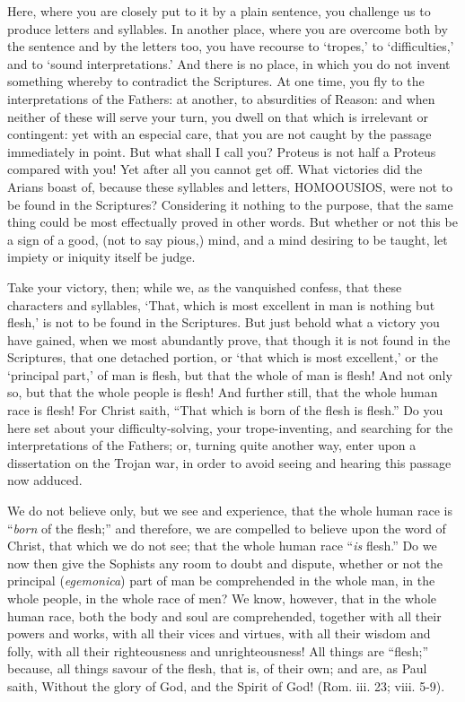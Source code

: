 Here, where you are closely put to it by a plain sentence, you challenge us to produce letters and syllables. In another place, where you are overcome both by the sentence and by the letters too, you have recourse to ‘tropes,’ to ‘difficulties,’ and to ‘sound interpretations.’ And there is no place, in which you do not invent something whereby to contradict the Scriptures. At one time, you fly to the interpretations of the Fathers: at another, to absurdities of Reason: and when neither of these will serve your turn, you dwell on that which is irrelevant or contingent: yet with an especial care, that you are not caught by the passage immediately in point. But what shall I call you? Proteus is not half a Proteus compared with you! Yet after all you cannot get off. What victories did the Arians boast of, because these syllables and letters, \textsc{HOMOOUSIOS}, were not to be found in the Scriptures? Considering it nothing to the purpose, that the same thing could be most effectually proved in other words. But whether or not this be a sign of a good, (not to say pious,) mind, and a mind desiring to be taught, let impiety or iniquity itself be judge.

Take your victory, then; while we, as the vanquished confess, that these characters and syllables, ‘That, which is most excellent in man is nothing but flesh,’ is not to be found in the Scriptures. But just behold what a victory you have gained, when we most abundantly prove, that though it is not found in the Scriptures, that one detached portion, or ‘that which is most excellent,’ or the ‘principal part,’ of man is flesh, but that the whole of man is flesh! And not only so, but that the whole people is flesh! And further still, that the whole human race is flesh! For Christ saith, “That which is born of the flesh is flesh.” Do you here set about your difficulty-solving, your trope-inventing, and searching for the interpretations of the Fathers; or, turning quite another way, enter upon a dissertation on the Trojan war, in order to avoid seeing and hearing this passage now adduced.

We do not believe only, but we see and experience, that the whole human race is “\emph{born }of the flesh;” and therefore, we are compelled to believe upon the word of Christ, that which we do not see; that the whole human race “\emph{is }flesh.” Do we now then give the Sophists any room to doubt and dispute, whether or not the principal (\emph{egemonica}) part of man be comprehended in the whole man, in the whole people, in the whole race of men? We know, however, that in the whole human race, both the body and soul are comprehended, together with all their powers and works, with all their vices and virtues, with all their wisdom and folly, with all their righteousness and unrighteousness! All things are “flesh;” because, all things savour of the flesh, that is, of their own; and are, as Paul saith, Without the glory of God, and the Spirit of God! (Rom. iii. 23; viii. 5-9).

